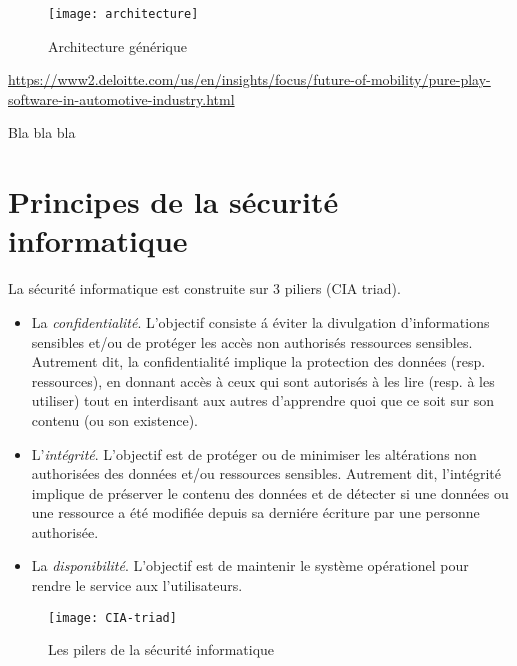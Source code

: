 \FloatBarrier
\begin{figure}
    \texttt{[image: architecture]}
    \caption{Architecture g\'en\'erique}
    \label{fig:archi}
\end{figure}
\url{https://www2.deloitte.com/us/en/insights/focus/future-of-mobility/pure-play-software-in-automotive-industry.html}
\FloatBarrier

Bla bla bla


\section {Principes de la s\'ecurit\'e informatique}
\medskip
{\Huge L}a s\'ecurit\'e informatique est construite sur 3 piliers (CIA triad).
  
\begin{itemize}
\setlength\itemsep{1em}
\item La \emph{confidentialit\'e}. L'objectif consiste \'a \'eviter la divulgation d'informations sensibles et/ou de prot\'eger les acc\`es non authoris\'es ressources sensibles. Autrement dit, la confidentialit\'e implique la protection des donn\'ees (resp. ressources), en donnant acc\`es \`a ceux qui sont autoris\'es \`a les lire (resp. \`a les utiliser) tout en interdisant aux autres d'apprendre quoi que ce soit sur son contenu (ou son existence).  
\item L'\emph{int\'egrit\'e}. L'objectif est de prot\'eger ou de minimiser les alt\'erations non authoris\'ees des donn\'ees et/ou ressources sensibles. Autrement dit, l'int\'egrit\'e implique de pr\'eserver le contenu des donn\'ees et de d\'etecter si une donn\'ees ou une ressource a \'et\'e modifi\'ee depuis sa derni\'ere \'ecriture par une personne authoris\'ee.  
\item La \emph{disponibilit\'e}. L'objectif est de maintenir le syst\`eme op\'erationel pour rendre le service aux l'utilisateurs.  
\end{itemize}

\FloatBarrier
\begin{figure}[h]
	\centering
    \texttt{[image: CIA-triad]}
    \caption{Les pilers de la s\'ecurit\'e informatique}
    \label{fig:CIA}
\end{figure}
\FloatBarrier


